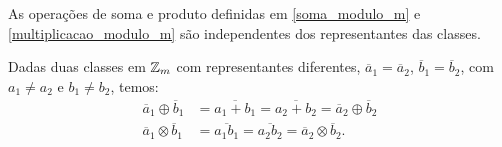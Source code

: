 \begin{proposicao}
	As opera{\c c}{\~o}es de soma e produto definidas em \eqref{soma_modulo_m} e \eqref{multiplicacao_modulo_m} s{\~a}o independentes dos representantes das classes.
\end{proposicao}
\begin{prova}
	Dadas duas classes em $\mathbb{Z}_m$ com representantes diferentes, $\overline{a}_{1} = \overline{a}_{2}$, $\overline{b}_{1} = \overline{b}_{2}$, com $a_{1}\ne a_{2}$ e $b_{1}\ne b_{2}$, temos:
	\begin{align*}
		\overline{a}_{1}\oplus \overline{b}_{1} &= \overline{a_{1}+b_{1}} = \overline{a_{2} + b_{2}} =  \overline{a}_{2}\oplus \overline{b}_{2}\\
		\overline{a}_{1}\otimes \overline{b}_{1} &= \overline{a_{1}b_{1}} = \overline{a_{2}b_{2}} = \overline{a}_{2}\otimes\overline{b}_{2}.
	\end{align*}
\end{prova}


